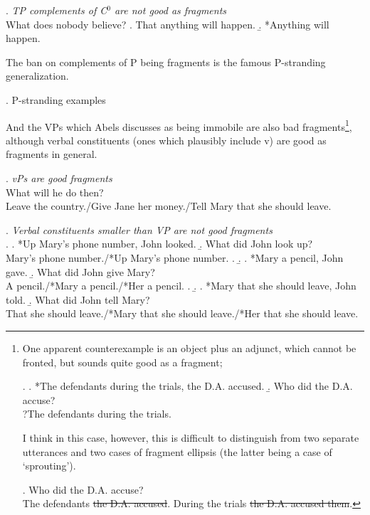 \documentclass[11pt,letterpaper]{article}
\begin{document}
 \ex. 	{\it TP complements of C$^0$ are not good as fragments}\\
 	What does nobody believe?
 	\a. That anything will happen.
 	\b. *Anything will happen.
 	
 The ban on complements of P being fragments is the famous P-stranding generalization.
 
 \ex. 	P-stranding examples %
 
 And the VPs which Abels discusses as being immobile are also bad fragments\footnote{One apparent counterexample is an object plus an adjunct, which cannot be fronted, but sounds quite good as a fragment;
 
 \ex.	\a. *The defendants during the trials, the D.A. accused.
 	\b. Who did the D.A. accuse?\\
 		?The defendants during the trials.
 
 I think in this case, however, this is difficult to distinguish from two separate utterances and two cases of fragment ellipsis (the latter being a case of `sprouting').
 
 \ex.	Who did the D.A. accuse?\\
 	The defendants \sout{the D.A. accused}. During the trials \sout{the D.A. accused them}.
 	
 {}
 
 }, although verbal constituents (ones which plausibly include v) are good as fragments in general.
 
 \ex. 	{\it vPs are good fragments}\\
 	What will he do then?\\
 	Leave the country./Give Jane her money./Tell Mary that she should leave.
 	
 \ex. 	{\it Verbal constituents smaller than VP are not good fragments}\\
 	\a. 	\a. *Up Mary's phone number, John looked.
 		\b. What did John look up?\\
 			Mary's phone number./*Up Mary's phone number.
 		\z.
 	\b.	\a. *Mary a pencil, John gave.
 		\b. What did John give Mary?\\
 			A pencil./*Mary a pencil./*Her a pencil.
 		\z.
 	\b. 	\a. *Mary that she should leave, John told.
 		\b. What did John tell Mary?\\
 			That she should leave./*Mary that she should leave./*Her that she should leave.
 
\end{document}
